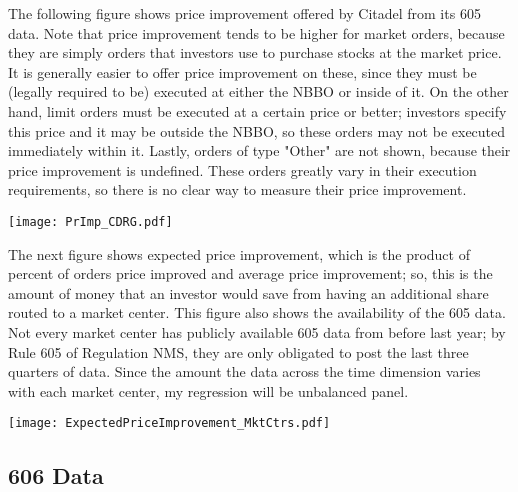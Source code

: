 \documentclass[12pt,a4paper]{article}
\begin{document}
		The following figure shows price improvement offered by Citadel from its 605 data. Note that price improvement tends to be higher for market orders, because they are simply orders that investors use to purchase stocks at the market price. It is generally easier to offer price improvement on these, since they must be (legally required to be) executed at either the NBBO or inside of it. On the other hand, limit orders must be executed at a certain price or better; investors specify this price and it may be outside the NBBO, so these orders may not be executed immediately within it. Lastly, orders of type "Other" are not shown, because their price improvement is undefined. These orders greatly vary in their execution requirements, so there is no clear way to measure their price improvement. 
			
		\begin{center}
			\texttt{[image: PrImp\_CDRG.pdf]}
		\end{center}
	
		The next figure shows expected price improvement, which is the product of percent of orders price improved and average price improvement; so, this is the amount of money that an investor would save from having an additional share routed to a market center. This figure also shows the availability of the 605 data. Not every market center has publicly available 605 data from before last year; by Rule 605 of Regulation NMS, they are only obligated to post the last three quarters of data. Since the amount the data across the time dimension varies with each market center, my regression will be unbalanced panel.  
		
		\begin{center}
			\texttt{[image: ExpectedPriceImprovement\_MktCtrs.pdf]}
		\end{center}
		
	\subsection{606 Data}
	
\end{document}
